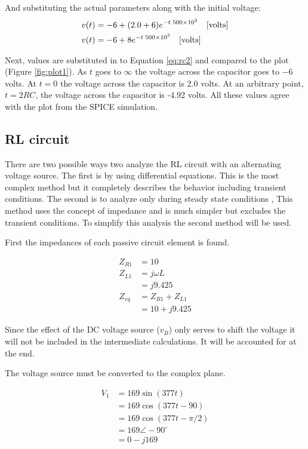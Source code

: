 \documentclass{article}
\providecommand{\e}[1]{\ensuremath{\times 10^{#1}}}
\begin{document}
And substituting the actual parameters along with the initial voltage:
\begin{align}
	v(t) &= -6 + (2.0 + 6) e^{-t \; 500\e{3}} \quad \mbox{[volts]} \notag \\
	v(t) &= -6 + 8 e^{-t \; 500\e{3}} \quad \mbox{[volts]}  \label{eq:rc2}
\end{align}

Next, values are substituted in to Equation \ref{eq:rc2} and compared to
the plot (Figure \ref{fig:plot1}).
As $t$ goes to $\infty$ the voltage across the capacitor goes to $-6$ volts.
At $t = 0$ the voltage across the capacitor is 2.0 volts.
At an arbitrary point, $t = 2 R C$, the voltage across the capacitor is -4.92 volts.
All these values agree with the plot from the SPICE simulation.


\subsection{RL circuit}

There are two possible ways two analyze the RL circuit with an alternating
voltage source.
The first is by using differential equations.
This is the most complex method but it completely describes the behavior
including transient conditions.
The second is to analyze only during steady state conditions
\cite[Pg. 330]{nilsson2008electric},
This method uses the concept of impedance and is much simpler but excludes
the transient conditions.
To simplify this analysis the second method will be used.

First the impedances of each passive circuit element is found.

\begin{align*}
	Z_{R1} &= 10 \\
	Z_{L1} &= j \omega L \\
		   &= j 9.425 \\
	Z_{eq} &= Z_{R1} + Z_{L1} \\
			&= 10 + j 9.425
\end{align*}

Since the effect of the DC voltage source ($v_B$) only serves
to shift the voltage it will not be included in the intermediate calculations.
It will be accounted for at the end.

The voltage source must be converted to the complex plane.

\begin{align*}
	V_1 &= 169 \sin(377 t) \\
		&= 169 \cos(377 t - 90) \\
		&= 169 \cos(377 t - \pi/2) \\
		&= 169 \angle -90^{\circ} \\
		&= 0 - j 169
\end{align*}
\end{document}
